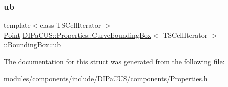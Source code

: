 \mbox{\label{structDIPaCUS_1_1Properties_1_1CurveBoundingBox_1_1BoundingBox_ab659426563a983cdd681beb88cf82a9a}} 
\subsubsection{\texorpdfstring{ub}{ub}}
{\footnotesize\ttfamily template$<$class T\+S\+Cell\+Iterator $>$ \\
\mbox{\hyperlink{structDIPaCUS_1_1Properties_1_1CurveBoundingBox_ad97cc519eea736f20195540853c23616}{Point}} \mbox{\hyperlink{structDIPaCUS_1_1Properties_1_1CurveBoundingBox}{D\+I\+Pa\+C\+U\+S\+::\+Properties\+::\+Curve\+Bounding\+Box}}$<$ T\+S\+Cell\+Iterator $>$\+::Bounding\+Box\+::ub}



The documentation for this struct was generated from the following file\+:\begin{DoxyCompactItemize}
\item 
modules/components/include/\+D\+I\+Pa\+C\+U\+S/components/\mbox{\hyperlink{Properties_8h}{Properties.\+h}}\end{DoxyCompactItemize}
